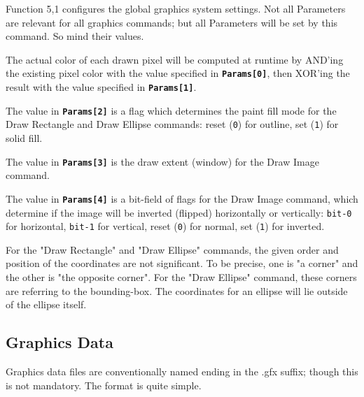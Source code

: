 \documentclass[12pt]{article}
\newcommand{\MonoSp}[1] {\fontsize{10pt}{10pt}\selectfont\texttt{#1}\normalsize}
\newcommand{\Param}[1] {\textbf{\texttt{Params[#1]}}}
\begin{document}
Function 5,1 configures the global graphics system settings.
Not all Parameters are relevant for all graphics commands;
but all Parameters will be set by this command. So mind their values.
\newline

The actual color of each drawn pixel will be computed at runtime
by AND'ing the existing pixel color with the value specified in \Param{0},
then XOR'ing the result with the value specified in \Param{1}.
\newline

The value in \Param{2} is a flag which determines the paint fill mode
for the Draw Rectangle and Draw Ellipse commands:
reset (\MonoSp{0}) for outline, set (\MonoSp{1}) for solid fill.
\newline

The value in \Param{3} is the draw extent (window) for the Draw Image command.
\newline

The value in \Param{4} is a bit-field of flags for the Draw Image command,
which determine if the image will be inverted (flipped) horizontally or vertically:
\MonoSp{bit-0} for horizontal, \MonoSp{bit-1} for vertical,
reset (\MonoSp{0}) for normal, set (\MonoSp{1}) for inverted.
\newline

For the "Draw Rectangle" and "Draw Ellipse" commands,
the given order and position of the coordinates are not significant.
To be precise, one is "a corner" and the other is "the opposite corner".
For the "Draw Ellipse" command, these corners are referring to the bounding-box.
The coordinates for an ellipse will lie outside of the ellipse itself.


\pagebreak


\subsection{Graphics Data}\label{subsec:graphics-data}

Graphics data files are conventionally named ending in the .gfx suffix;
though this is not mandatory.
The format is quite simple.
\end{document}
